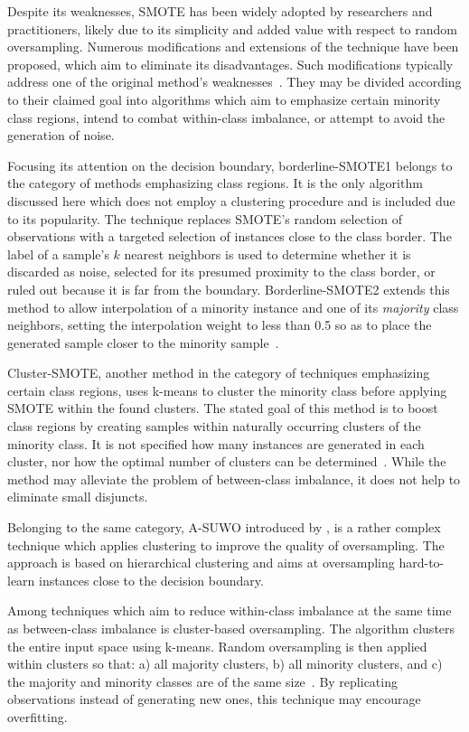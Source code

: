 \documentclass[sort&compress]{elsarticle}
\begin{document}
Despite its weaknesses, \ac{SMOTE} has been widely adopted by researchers and
practitioners, likely due to its simplicity and added value with respect to
random oversampling. Numerous modifications and extensions of the technique have
been proposed, which aim to eliminate its disadvantages. Such modifications
typically address one of the original method's
weaknesses~\citep{Vanhoeyveld.2017}. They may be divided according to their
claimed goal into algorithms which aim to emphasize certain minority class
regions, intend to combat within-class imbalance, or attempt to avoid the
generation of noise.

Focusing its attention on the decision boundary, borderline-\ac{SMOTE}1 belongs
to the category of methods emphasizing class regions. It is the only algorithm
discussed here which does not employ a clustering procedure and is included due
to its popularity. The technique replaces \ac{SMOTE}'s random selection of
observations with a targeted selection of instances close to the class border.
The label of a sample's $k$ nearest neighbors is used to determine whether it is
discarded as noise, selected for its presumed proximity to the class border, or
ruled out because it is far from the boundary. Borderline-\ac{SMOTE}2 extends
this method to allow interpolation of a minority instance and one of its
\textit{majority} class neighbors, setting the interpolation weight to less than
0.5 so as to place the generated sample closer to the minority
sample~\citep{Han.2005}.

Cluster-SMOTE, another method in the category of techniques emphasizing certain
class regions, uses k-means to cluster the minority class before applying
\ac{SMOTE} within the found clusters. The stated goal of this method is to boost
class regions by creating samples within naturally occurring clusters of the
minority class. It is not specified how many instances are generated in each
cluster, nor how the optimal number of clusters can be
determined~\citep{Cieslak.2006}. While the method may alleviate the problem of
between-class imbalance, it does not help to eliminate small disjuncts.

Belonging to the same category, \ac{A-SUWO} introduced by
\citet{Nekooeimehr.2016}, is a rather complex technique which applies clustering
to improve the quality of oversampling. The approach is based on hierarchical
clustering and aims at oversampling hard-to-learn instances close to the
decision boundary.

Among techniques which aim to reduce within-class imbalance at the same time as
between-class imbalance is cluster-based oversampling. The algorithm clusters
the entire input space using k-means. Random oversampling is then applied within
clusters so that: a) all majority clusters, b) all minority clusters, and c) the
majority and minority classes are of the same size~\citep{Jo.2004}. By
replicating observations instead of generating new ones, this technique may
encourage overfitting.
\end{document}
